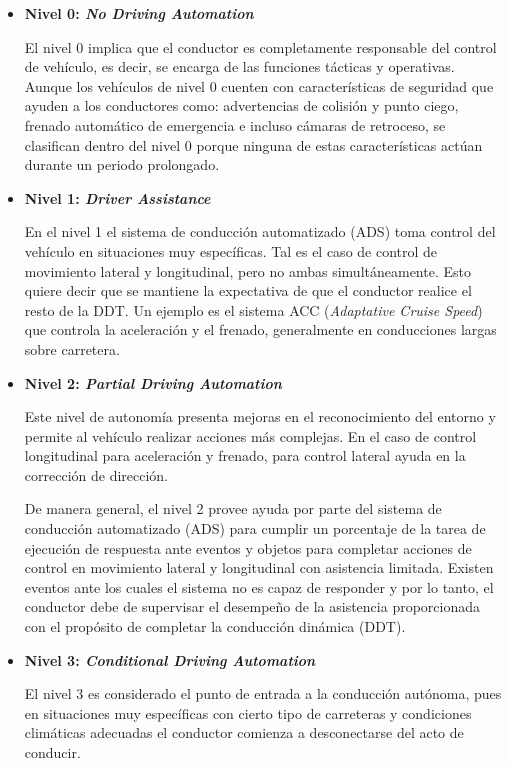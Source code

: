 \begin{itemize}
    \item \textbf{Nivel 0: \textit{No Driving Automation}} 
    
    El nivel 0 implica que el conductor es completamente responsable del control de vehículo, es decir, se encarga de las funciones tácticas y operativas. Aunque los vehículos de nivel 0 cuenten con características de seguridad que ayuden a los conductores como: advertencias de colisión y punto ciego, frenado automático de emergencia e incluso cámaras de retroceso,  se clasifican dentro del nivel 0 porque ninguna de estas características actúan durante un periodo prolongado.
    
    \item \textbf{Nivel 1: \textit{Driver Assistance}} 
    
    En el nivel 1 el sistema de conducción automatizado (ADS) toma control del vehículo en situaciones muy específicas. Tal es el caso de control de movimiento lateral y longitudinal, pero no ambas simultáneamente. Esto quiere decir que se mantiene la expectativa de que el conductor realice el resto de la DDT. Un ejemplo es el sistema ACC (\textit{Adaptative Cruise Speed}) que controla la aceleración y el frenado, generalmente en conducciones largas sobre carretera.
    
    \item \textbf{Nivel 2: \textit{Partial Driving Automation}} 
    
    Este nivel de autonomía presenta mejoras en el reconocimiento del entorno y permite al vehículo realizar acciones más complejas. En el caso de control longitudinal para aceleración y frenado, para control lateral ayuda en la corrección de dirección.
    
    De manera general, el nivel 2 provee ayuda por parte del sistema de conducción automatizado (ADS) para cumplir un porcentaje de la tarea de ejecución de respuesta ante eventos y objetos para completar acciones de control en movimiento lateral y longitudinal con asistencia limitada. Existen eventos ante los cuales el sistema no es capaz de responder y por lo tanto, el conductor debe de supervisar el desempeño de la asistencia proporcionada con el  propósito de completar la conducción dinámica (DDT).
    
    \item \textbf{Nivel 3: \textit{Conditional Driving Automation}} 
    
    El nivel 3 es considerado el punto de entrada a la conducción autónoma, pues en situaciones muy específicas con cierto tipo de carreteras y condiciones climáticas adecuadas el conductor comienza a desconectarse del acto de conducir.  
    

\end{itemize}
